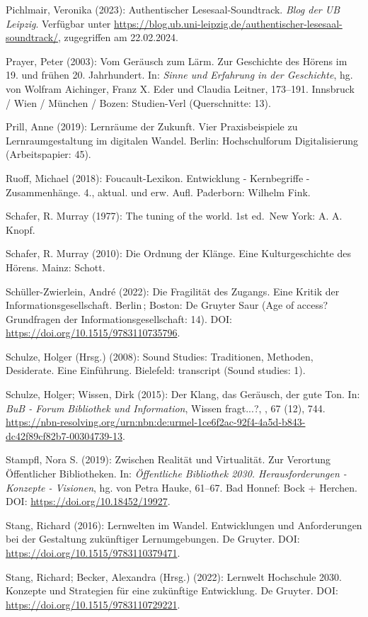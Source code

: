 \documentclass[a4paper,
fontsize=11pt,
oneside,
numbers=noperiodatend,
parskip=half-,
bibliography=totoc,
final
]{scrartcl}
\begin{document}
Pichlmair, Veronika (2023): Authentischer Lesesaal-Soundtrack.
\emph{Blog der UB Leipzig}. Verfügbar unter
\url{https://blog.ub.uni-leipzig.de/authentischer-lesesaal-soundtrack/},
zugegriffen am 22.02.2024.

Prayer, Peter (2003): Vom Geräusch zum Lärm. Zur Geschichte des Hörens
im 19. und frühen 20. Jahrhundert. In: \emph{Sinne und Erfahrung in der
Geschichte}, hg. von Wolfram Aichinger, Franz X. Eder und Claudia
Leitner, 173--191. Innsbruck / Wien / München / Bozen: Studien-Verl
(Querschnitte: 13).

Prill, Anne (2019): Lernräume der Zukunft. Vier Praxisbeispiele zu
Lernraumgestaltung im digitalen Wandel. Berlin: Hochschulforum
Digitalisierung (Arbeitspapier: 45).

Ruoff, Michael (2018): Foucault-Lexikon. Entwicklung - Kernbegriffe -
Zusammenhänge. 4., aktual. und erw. Aufl. Paderborn: Wilhelm Fink.

Schafer, R. Murray (1977): The tuning of the world. 1st ed.~New York: A.
A. Knopf.

Schafer, R. Murray (2010): Die Ordnung der Klänge. Eine Kulturgeschichte
des Hörens. Mainz: Schott.

Schüller-Zwierlein, André (2022): Die Fragilität des Zugangs. Eine
Kritik der Informationsgesellschaft. Berlin\,; Boston: De Gruyter Saur
(Age of access? Grundfragen der Informationsgesellschaft: 14). DOI:
\url{https://doi.org/10.1515/9783110735796}.

Schulze, Holger (Hrsg.) (2008): Sound Studies: Traditionen, Methoden,
Desiderate. Eine Einführung. Bielefeld: transcript (Sound studies: 1).

Schulze, Holger; Wissen, Dirk (2015): Der Klang, das Geräusch, der gute
Ton. In: \emph{BuB - Forum Bibliothek und Information}, Wissen
fragt...?, , 67 (12), 744.
\url{https://nbn-resolving.org/urn:nbn:de:urmel-1ce6f2ac-92f4-4a5d-b843-dc42f89cf82b7-00304739-13}.

Stampfl, Nora S. (2019): Zwischen Realität und Virtualität. Zur
Verortung Öffentlicher Bibliotheken. In: \emph{Öffentliche Bibliothek
2030. Herausforderungen - Konzepte - Visionen}, hg. von Petra Hauke,
61--67. Bad Honnef: Bock + Herchen. DOI:
\url{https://doi.org/10.18452/19927}.

Stang, Richard (2016): Lernwelten im Wandel. Entwicklungen und
Anforderungen bei der Gestaltung zukünftiger Lernumgebungen. De Gruyter.
DOI: \url{https://doi.org/10.1515/9783110379471}.

Stang, Richard; Becker, Alexandra (Hrsg.) (2022): Lernwelt Hochschule
2030. Konzepte und Strategien für eine zukünftige Entwicklung. De
Gruyter. DOI: \url{https://doi.org/10.1515/9783110729221}.
\end{document}
